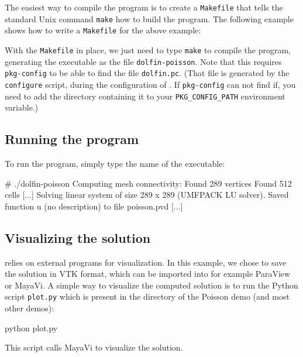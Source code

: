 The easiest way to compile the program is to create a
\texttt{Makefile} that tells the standard Unix command \texttt{make}
how to build the program. The following example shows how to write a
\texttt{Makefile} for the above example:
\footnotesize
{}
\normalsize

With the \texttt{Makefile} in place, we just need to type
\texttt{make} to compile the program, generating the executable
as the file \texttt{dolfin-poisson}. Note that this requires
\texttt{pkg-config} to be able to find the file \texttt{dolfin.pc}.
(That file is generated by the \texttt{configure} script, during the 
configuration of \dolfin{}. If \texttt{pkg-config} can not find if, you need 
to add the directory containing it to your \texttt{PKG\_CONFIG\_PATH} 
environment variable.)

\subsection{Running the program}

To run the program, simply type the name of the executable:
\begin{code}
# ./dolfin-poisson
Computing mesh connectivity:
Found 289 vertices
Found 512 cells
[...]
Solving linear system of size 289 x 289 (UMFPACK LU solver).
Saved function u (no description) to file poisson.pvd [...]
\end{code}

\subsection{Visualizing the solution}

\dolfin{} relies on external programs for visualization. In this
example, we chose to save the solution in VTK format, which can be
imported into for example ParaView or MayaVi. A simple way to
visualize the computed solution is to run the Python script
\texttt{plot.py} which is present in the directory of the Poisson demo
(and most other demos):
\begin{code}
python plot.py
\end{code}
This script calls MayaVi to visualize the solution.

